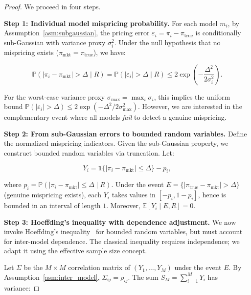 \documentclass[11pt,a4paper]{article}
\theoremstyle{plain}
\theoremstyle{definition}
\theoremstyle{remark}
\newcommand{\E}{\mathbb{E}}
\newcommand{\Pbb}{\mathbb{P}}
\newcommand{\indicator}{\mathbf{1}}
\begin{document}
\begin{proof}
We proceed in four steps.

\medskip\noindent\textbf{Step 1: Individual model mispricing probability.}
For each model $m_i$, by Assumption~\ref{asm:subgaussian}, the pricing error $\varepsilon_i = \pi_i - \pi_{\text{true}}$ is conditionally sub-Gaussian with variance proxy $\sigma_i^2$. Under the null hypothesis that no mispricing exists ($\pi_{\text{mkt}} = \pi_{\text{true}}$), we have:

\begin{equation}\label{eq:step1}
  \Pbb(|\pi_i - \pi_{\text{mkt}}| > \Delta \mid R) = \Pbb(|\varepsilon_i| > \Delta \mid R) \leq 2\exp\!\left(-\frac{\Delta^2}{2\sigma_i^2}\right).
\end{equation}

For the worst-case variance proxy $\sigma_{\max} = \max_i \sigma_i$, this implies the uniform bound $\Pbb(|\varepsilon_i| > \Delta) \leq 2\exp(-\Delta^2 / 2\sigma_{\max}^2)$. However, we are interested in the complementary event where all models \emph{fail} to detect a genuine mispricing.

\medskip\noindent\textbf{Step 2: From sub-Gaussian errors to bounded random variables.}
Define the normalized mispricing indicators. Given the sub-Gaussian property, we construct bounded random variables via truncation. Let:

\begin{equation}\label{eq:Y_def}
  Y_i = \indicator\{|\pi_i - \pi_{\text{mkt}}| \leq \Delta\} - p_i,
\end{equation}

where $p_i = \Pbb(|\pi_i - \pi_{\text{mkt}}| \leq \Delta \mid R)$. Under the event $E = \{|\pi_{\text{true}} - \pi_{\text{mkt}}| > \Delta\}$ (genuine mispricing exists), each $Y_i$ takes values in $[-p_i, 1-p_i]$, hence is bounded in an interval of length $1$. Moreover, $\E[Y_i \mid E, R] = 0$.

\medskip\noindent\textbf{Step 3: Hoeffding's inequality with dependence adjustment.}
We now invoke Hoeffding's inequality~\citep{hoeffding1963probability} for bounded random variables, but must account for inter-model dependence. The classical inequality requires independence; we adapt it using the effective sample size concept.

Let $\Sigma$ be the $M \times M$ correlation matrix of $(Y_1, \dots, Y_M)$ under the event $E$. By Assumption~\ref{asm:inter_model}, $\Sigma_{ij} = \rho_{ij}$. The sum $S_M = \sum_{i=1}^M Y_i$ has variance:


\end{proof}
\end{document}
